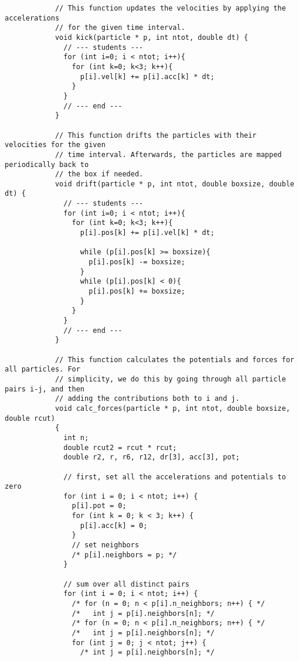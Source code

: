         \begin{lstlisting}
            // This function updates the velocities by applying the accelerations 
            // for the given time interval.
            void kick(particle * p, int ntot, double dt) {
              // --- students ---
              for (int i=0; i < ntot; i++){
                for (int k=0; k<3; k++){
                  p[i].vel[k] += p[i].acc[k] * dt;
                }
              }
              // --- end ---
            }
            
            // This function drifts the particles with their velocities for the given 
            // time interval. Afterwards, the particles are mapped periodically back to 
            // the box if needed.
            void drift(particle * p, int ntot, double boxsize, double dt) {
              // --- students ---
              for (int i=0; i < ntot; i++){
                for (int k=0; k<3; k++){
                  p[i].pos[k] += p[i].vel[k] * dt;
            
                  while (p[i].pos[k] >= boxsize){
                    p[i].pos[k] -= boxsize;
                  }
                  while (p[i].pos[k] < 0){
                    p[i].pos[k] += boxsize;
                  }
                }
              }
              // --- end ---
            }
            
            // This function calculates the potentials and forces for all particles. For 
            // simplicity, we do this by going through all particle pairs i-j, and then 
            // adding the contributions both to i and j.
            void calc_forces(particle * p, int ntot, double boxsize, double rcut)
            {
              int n;
              double rcut2 = rcut * rcut;
              double r2, r, r6, r12, dr[3], acc[3], pot;
            
              // first, set all the accelerations and potentials to zero
              for (int i = 0; i < ntot; i++) {
                p[i].pot = 0;
                for (int k = 0; k < 3; k++) {
                  p[i].acc[k] = 0;
                }
                // set neighbors
                /* p[i].neighbors = p; */
              }
            
              // sum over all distinct pairs
              for (int i = 0; i < ntot; i++) {
                /* for (n = 0; n < p[i].n_neighbors; n++) { */
                /*   int j = p[i].neighbors[n]; */
                /* for (n = 0; n < p[i].n_neighbors; n++) { */
                /*   int j = p[i].neighbors[n]; */
                for (int j = 0; j < ntot; j++) {
                  /* int j = p[i].neighbors[n]; */
            

\end{lstlisting}
